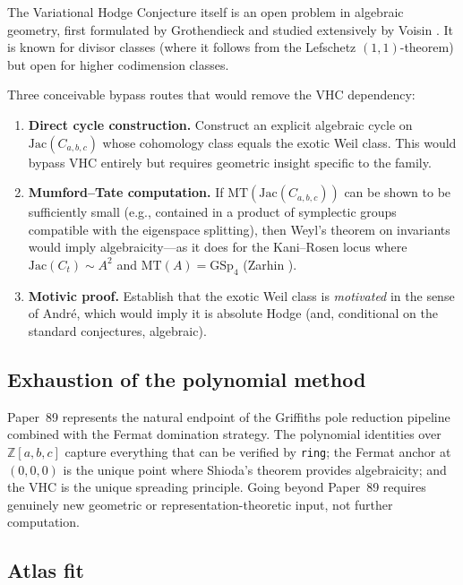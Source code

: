 \documentclass[11pt,a4paper]{article}
\theoremstyle{definition}
\theoremstyle{remark}
\newcommand{\ZZ}{\mathbb{Z}}
\newcommand{\MT}{\mathrm{MT}}
\newcommand{\GSp}{\mathrm{GSp}}
\newcommand{\Jac}{\mathrm{Jac}}
\begin{document}
The Variational Hodge Conjecture itself is an open problem in algebraic
geometry, first formulated by Grothendieck \cite{Grothendieck1966} and
studied extensively by Voisin \cite{Voisin2002, Voisin2007}.
It is known for divisor classes (where it follows from the Lefschetz
$(1,1)$-theorem) but open for higher codimension classes.

Three conceivable bypass routes that would remove the VHC dependency:
\begin{enumerate}[nosep]
  \item \textbf{Direct cycle construction.}
    Construct an explicit algebraic cycle on $\Jac(C_{a,b,c})$ whose
    cohomology class equals the exotic Weil class.
    This would bypass VHC entirely but requires geometric insight specific
    to the family.

  \item \textbf{Mumford--Tate computation.}
    If $\MT(\Jac(C_{a,b,c}))$ \cite{Mumford1966, Moonen1999} can be shown to be sufficiently small
    (e.g., contained in a product of symplectic groups compatible with
    the eigenspace splitting), then Weyl's theorem on invariants would
    imply algebraicity---as it does for the Kani--Rosen locus where
    $\Jac(C_t) \sim A^2$ and $\MT(A) = \GSp_4$ (Zarhin \cite{Zarhin1983}).

  \item \textbf{Motivic proof.}
    Establish that the exotic Weil class is \emph{motivated} in the
    sense of Andr\'e, which would imply it is absolute Hodge
    (and, conditional on the standard conjectures, algebraic).
\end{enumerate}

\subsection{Exhaustion of the polynomial method}

Paper~89 represents the natural endpoint of the Griffiths pole reduction
pipeline combined with the Fermat domination strategy.
The polynomial identities over $\ZZ[a,b,c]$ capture everything that can
be verified by \texttt{ring}; the Fermat anchor at $(0,0,0)$ is the
unique point where Shioda's theorem provides algebraicity; and the VHC
is the unique spreading principle.
Going beyond Paper~89 requires genuinely new geometric or representation-theoretic
input, not further computation.


\subsection{Atlas fit}
\end{document}
